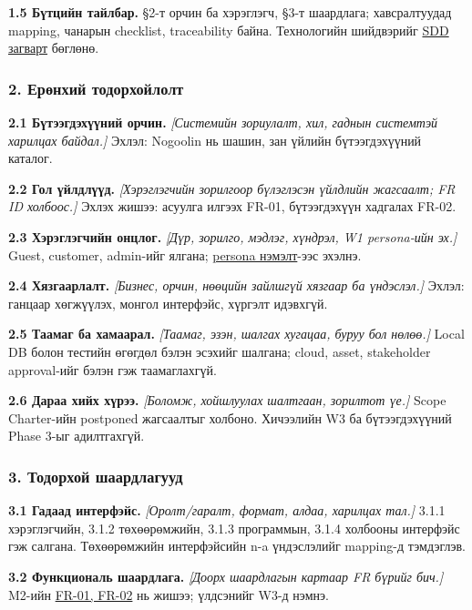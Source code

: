 \documentclass[
  11pt,
  a4paper,
]{article}
\begin{document}
\textbf{1.5 Бүтцийн тайлбар.} §2-т орчин ба хэрэглэгч, §3-т шаардлага;
хавсралтуудад mapping, чанарын checklist, traceability байна.
Технологийн шийдвэрийг \href{../../architecture/sdd-template.md}{SDD
загварт} бөглөнө.

\subsubsection{2. Ерөнхий
тодорхойлолт}\label{doc3-ux435ux440ux4e9ux43dux445ux438ux439-ux442ux43eux434ux43eux440ux445ux43eux439ux43bux43eux43bux442}

\textbf{2.1 Бүтээгдэхүүний орчин.} \emph{{[}Системийн зориулалт, хил,
гаднын системтэй харилцах байдал.{]}} Эхлэл: Nogoolin нь шашин, зан
үйлийн бүтээгдэхүүний каталог.

\textbf{2.2 Гол үйлдлүүд.} \emph{{[}Хэрэглэгчийн зорилгоор бүлэглэсэн
үйлдлийн жагсаалт; FR ID холбоос.{]}} Эхлэх жишээ: асуулга илгээх FR-01,
бүтээгдэхүүн хадгалах FR-02.

\textbf{2.3 Хэрэглэгчийн онцлог.} \emph{{[}Дүр, зорилго, мэдлэг,
хүндрэл, W1 persona-ийн эх.{]}} Guest, customer, admin-ийг ялгана;
\href{wiki/persona-and-pivot.md}{persona нэмэлт}-ээс эхэлнэ.

\textbf{2.4 Хязгаарлалт.} \emph{{[}Бизнес, орчин, нөөцийн зайлшгүй
хязгаар ба үндэслэл.{]}} Эхлэл: ганцаар хөгжүүлэх, монгол интерфэйс,
хүргэлт идэвхгүй.

\textbf{2.5 Таамаг ба хамаарал.} \emph{{[}Таамаг, эзэн, шалгах хугацаа,
буруу бол нөлөө.{]}} Local DB болон тестийн өгөгдөл бэлэн эсэхийг
шалгана; cloud, asset, stakeholder approval-ийг бэлэн гэж таамаглахгүй.

\textbf{2.6 Дараа хийх хүрээ.} \emph{{[}Боломж, хойшлуулах шалтгаан,
зорилтот үе.{]}} Scope Charter-ийн postponed жагсаалтыг холбоно.
Хичээлийн W3 ба бүтээгдэхүүний Phase 3-ыг адилтгахгүй.

\subsubsection{3. Тодорхой
шаардлагууд}\label{doc3-ux442ux43eux434ux43eux440ux445ux43eux439-ux448ux430ux430ux440ux434ux43bux430ux433ux443ux443ux434}

\textbf{3.1 Гадаад интерфэйс.} \emph{{[}Оролт/гаралт, формат, алдаа,
харилцах тал.{]}} 3.1.1 хэрэглэгчийн, 3.1.2 төхөөрөмжийн, 3.1.3
программын, 3.1.4 холбооны интерфэйс гэж салгана. Төхөөрөмжийн
интерфэйсийн n-a үндэслэлийг mapping-д тэмдэглэв.

\textbf{3.2 Функциональ шаардлага.} \emph{{[}Доорх шаардлагын картаар FR
бүрийг бич.{]}} M2-ийн \href{../../requirements/requirements.md}{FR-01,
FR-02} нь жишээ; үлдсэнийг W3-д нэмнэ.
\end{document}

